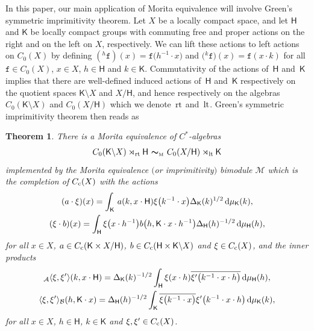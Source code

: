 \documentclass[pdftex]{sigma}
\numberwithin{equation}{section}
\newcommand{\mbf}[1]{{\boldsymbol {#1} }}
\def\dd{{\rm d}}
\newcommand{\sfH}{\mathsf{H}}
\newcommand{\sfK}{\mathsf{K}}
\newcommand{\lt}{{\rm lt}}
\newcommand{\rt}{{\rm rt}}
\def\alg{{\mathcal A}}
\def\balg{{\mathcal B}}
\def\Mcal{{\mathcal M}}
\newtheorem{Theorem}{Theorem}[section]
\begin{document}
In this paper, our main application of Morita equivalence will involve
Green's symmetric imprimitivity theorem. Let $X$ be a locally compact space, and let
$\sfH $ and $\sfK $ be locally compact groups with commuting free and
proper actions on the right and on the left on $X$, respectively. We can lift these
actions to left actions on $C_0(X)$ by defining
$({}^h\mathtt{f})(x)=\mathtt{f}\big(h^{-1}\cdot x\big)$ and $\big({}^k\mathtt{f}\big)(x)=\mathtt{f}(x\cdot k)$
for all $\mathtt{f}\in C_0(X)$, $x\in X$, $h\in \sfH$ and $k\in \sfK $. Commutativity
of the actions of~$\sfH $ and~$\sfK $ implies that there are well-defined
induced actions of~$\sfH $ and~$\sfK $
respectively on the quotient spaces $\sfK {\setminus} X$ and $X/\sfH $, and hence
respectively on the algebras $C_0(\sfK {\setminus} X)$ and
$C_0(X/\sfH )$ which we denote~$\rt$ and~$\lt$. Green's symmetric imprimitivity theorem then reads as~\cite[Corollary~4.10]{Williams2007}
\begin{Theorem} \label{thm:Green}
There is a Morita
equivalence of $C^*$-algebras
\begin{gather}\label{eq:Greenimprim}
C_0(\sfK {\setminus} X)\rtimes_\rt \sfH \ \mbf\sim_{\text{\rm \tiny M}} \ C_0(X/\sfH )\rtimes_\lt \sfK
\end{gather}
implemented by the Morita equivalence $($or imprimitivity$)$
bimodule $\Mcal$ which is the completion of $C_{\rm c}(X)$ with the
actions
\begin{gather*}
(a\cdot\xi)(x) =\int_\sfK\,a(k,x\cdot\sfH) \xi\big(k^{-1}\cdot x\big)
\Delta_\sfK(k)^{1/2} \, \dd\mu_\sfK(k) , \\
(\xi\cdot b)(x) =\int_\sfH \xi\big(x\cdot h^{-1}\big) b\big(h,\sfK\cdot x\cdot h^{-1}\big) \Delta_\sfH(h)^{-1/2} \, \dd\mu_\sfH(h) ,
\end{gather*}
for all $x\in X$, $a\in C_{\rm c}(\sfK\times X/\sfH)$, $b\in C_{\rm
 c}(\sfH\times \sfK {\setminus} X)$ and $\xi\in C_{\rm
 c}(X)$, and the inner products
\begin{gather*}
{}_\alg\langle\xi,\xi'\rangle(k,x\cdot\sfH) = \Delta_\sfK(k)^{-1/2}
\int_\sfH \xi(x\cdot h) \overline{\xi'\big(k^{-1}\cdot x\cdot h\big)} \,
\dd\mu_\sfH(h) , \nonumber\\
\langle\xi,\xi'\rangle_\balg(h,\sfK\cdot x) =
\Delta_\sfH(h)^{-1/2} \int_\sfK \overline{\xi\big(k^{-1}\cdot x\big)}
\xi'\big(k^{-1}\cdot x\cdot h\big) \, \dd\mu_\sfK(k)  ,
\end{gather*}
for all $x\in X$, $h\in\sfH$, $k\in\sfK$ and $\xi,\xi'\in C_{\rm c}(X)$.
\end{Theorem}
\end{document}

